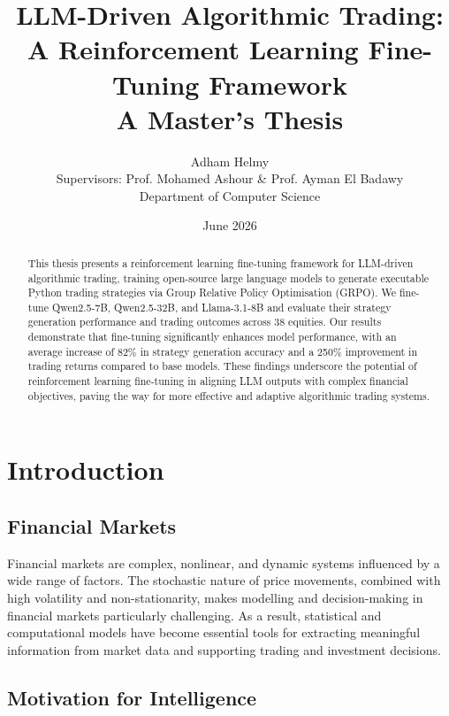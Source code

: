 \documentclass[12pt, a4paper]{report}
\title{%
  \textbf{LLM-Driven Algorithmic Trading: A Reinforcement Learning Fine-Tuning Framework} \\[0.5em]
  \large A Master's Thesis
}
\author{Adham Helmy \\ \small Supervisors: Prof. Mohamed Ashour \& Prof. Ayman El Badawy \\ \small Department of Computer Science}
\date{June 2026}
\begin{document}
\maketitle
\thispagestyle{empty}
\newpage

\begin{abstract}
\noindent
This thesis presents a reinforcement learning fine-tuning framework for LLM-driven algorithmic
trading, training open-source large language models to generate executable Python trading
strategies via Group Relative Policy Optimisation (GRPO).
We fine-tune Qwen2.5-7B, Qwen2.5-32B, and Llama-3.1-8B and evaluate their strategy generation
performance and trading outcomes across 38 equities. 
Our results demonstrate that fine-tuning significantly enhances model performance, 
with an average increase of 82\% in strategy generation accuracy and a 250\% improvement in trading returns compared to base models. 
These findings underscore the potential of reinforcement learning fine-tuning in aligning LLM outputs with complex financial objectives, 
paving the way for more effective and adaptive algorithmic trading systems.
\end{abstract}

\tableofcontents
\listoffigures
\listoftables

\chapter{Introduction}
\label{ch:intro}

\section{Financial Markets}
\label{sec:fin-markets}

  Financial markets are complex, nonlinear, and dynamic systems influenced by a wide range of factors.
The stochastic nature of price movements, combined with high volatility and non-stationarity, makes
modelling and decision-making in financial markets particularly challenging. As a result, statistical
and computational models have become essential tools for extracting meaningful information from market
data and supporting trading and investment decisions.

\section{Motivation for Intelligence}
\label{sec:motivation}
\end{document}
